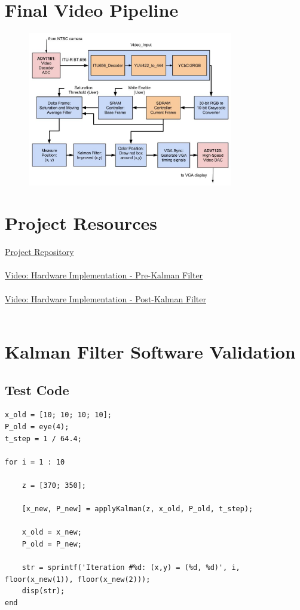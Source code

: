\documentclass[11pt]{article} %
\begin{document}
\section{Final Video Pipeline}
\label{sec:finalPipe}
\begin{figure}[h]
\centering
\includegraphics[width=0.8\textwidth]{./images/final_pipeline.jpg}
\end{figure}
\section{Project Resources}
\label{sec:links}
\href{https://github.com/bbrown1867/ObjectTracking}{Project Repository} \\\\
\href{https://www.youtube.com/watch?v=8xPpoj7ziko}{Video: Hardware Implementation - Pre-Kalman Filter} \\\\
\href{https://www.youtube.com/watch?v=48JgtHcgVmo}{Video: Hardware Implementation - Post-Kalman Filter} \\\\
\vspace{3 cm}
\section{Kalman Filter Software Validation}
\label{sec:software}
\subsection{Test Code}
\begin{lstlisting}
x_old = [10; 10; 10; 10];
P_old = eye(4);
t_step = 1 / 64.4;

for i = 1 : 10

    z = [370; 350];

    [x_new, P_new] = applyKalman(z, x_old, P_old, t_step);

    x_old = x_new;
    P_old = P_new;

    str = sprintf('Iteration #%d: (x,y) = (%d, %d)', i, floor(x_new(1)), floor(x_new(2)));
    disp(str);
end
\end{lstlisting}
\end{document}
